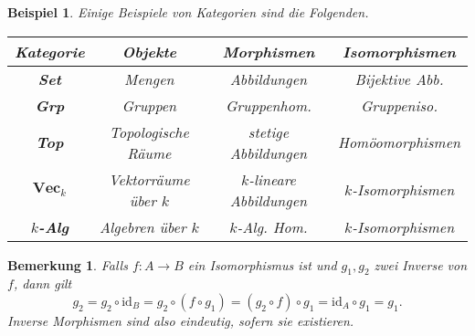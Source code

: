 \documentclass[a4paper, 11pt]{scrartcl}
\newcommand{\id}{\text{id}}
\theoremstyle{basicstyle}
\newtheorem{bemerkung}[definition]{Bemerkung}
\newtheorem{beispiel}[definition]{Beispiel}
\begin{document}
    \begin{beispiel}\leavevmode
        Einige Beispiele von Kategorien sind die Folgenden.
        \begin{figure*}[ht!]
            \centering
            \setlength{\tabcolsep}{10pt}
            \renewcommand{\arraystretch}{1.5}
            \begin{tabular}{|c|c|c|c|}
                \hline
                \textbf{Kategorie} & \textbf{Objekte}   & \textbf{Morphismen}   & \textbf{Isomorphismen} \\ \hline
                {\textbf{Set}}          & Mengen                 & Abbildungen               & Bijektive Abb.             \\ \hline
                {\textbf{Grp}}          & Gruppen                & Gruppenhom.               & Gruppeniso.                \\ \hline
                {\textbf{Top}}          & Topologische Räume     & stetige Abbildungen       & Homöomorphismen            \\ \hline
                {\(\textbf{Vec}_{k}\)}  & Vektorräume über \(k\) & \(k\)-lineare Abbildungen & \(k\)-Isomorphismen        \\ \hline
                {\textbf{\(k\)-Alg}}    & Algebren über \(k\)    & \(k\)-Alg. Hom.           & \(k\)-Isomorphismen        \\ \hline
            \end{tabular}
        \end{figure*}
    \end{beispiel}

    \begin{bemerkung}
        Falls \(f: A \to B\) ein Isomorphismus ist und \(g_1, g_2\) zwei Inverse von \(f\), dann gilt
        \[g_2 = g_2 \circ \id_B = g_2 \circ (f \circ g_1) = (g_2 \circ f) \circ g_1 = \id_A \circ g_1 = g_1.\]
        Inverse Morphismen sind also eindeutig, sofern sie existieren.
    \end{bemerkung}
\end{document}
